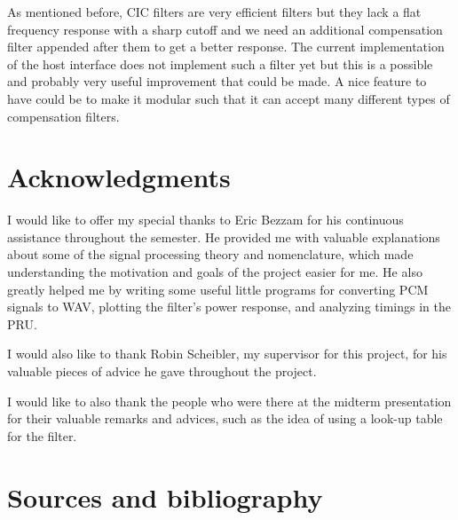\documentclass[]{report}
\begin{document}
As mentioned before, CIC filters are very efficient filters but they
lack a flat frequency response with a sharp cutoff and we need an
additional compensation filter appended after them to get a better
response. The current implementation of the host interface does not
implement such a filter yet but this is a possible and probably very
useful improvement that could be made. A nice feature to have could be
to make it modular such that it can accept many different types of
compensation filters.

\hypertarget{acknowledgments}{%
\chapter{Acknowledgments}\label{acknowledgments}}

I would like to offer my special thanks to Eric Bezzam for his
continuous assistance throughout the semester. He provided me with
valuable explanations about some of the signal processing theory and
nomenclature, which made understanding the motivation and goals of the
project easier for me. He also greatly helped me by writing some useful
little programs for converting PCM signals to WAV, plotting the filter's
power response, and analyzing timings in the PRU.

I would also like to thank Robin Scheibler, my supervisor for this
project, for his valuable pieces of advice he gave throughout the
project.

I would like to also thank the people who were there at the midterm
presentation for their valuable remarks and advices, such as the idea of
using a look-up table for the filter.

\hypertarget{sources-and-bibliography}{%
\chapter*{Sources and bibliography}\label{sources-and-bibliography}}
\end{document}
